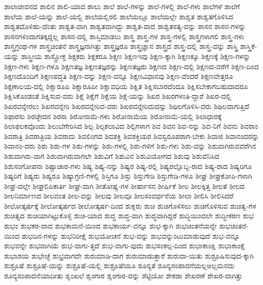 {ಶಾಲಾಜೀವನದ
ಶಾಲಿನ
ಶಾಲಿ-ಯಾದ
ಶಾಲು
ಶಾಲೆ
ಶಾಲೆ-ಗಳನ್ನು
ಶಾಲೆ-ಗಳಲ್ಲಿ
ಶಾಲೆ-ಗಳು
ಶಾಲೆಗಳೆ
ಶಾಲೆಗೆ
ಶಾಲೆಯ
ಶಾಲೆ-ಯನ್ನು
ಶಾಲೆ-ಯಲ್ಲಿ
ಶಾಲೆಯಲ್ಲಿರಲಿ
ಶಾಲೆಯಲ್ಲೂ
ಶಾಲೆಯಲ್ಲೇ
ಶಾಶ್ವತ
ಶಾಶ್ವತಗೊಳಿಸಿದ
ಶಾಶ್ವತದೊಳಿಹು-ದೆಂತು
ಶಾಶ್ವತ-ವಾಗಿ
ಶಾಶ್ವತವಾಗಿದ್ದು
ಶಾಶ್ವತ-ವಾದ
ಶಾಶ್ವತಸತ್ಯ-ವನ್ನು
ಶಾಸನ
ಶಾಸನ-ಗಳನ್ನು
ಶಾಸನಗಳಿಂದಾಗತಕ್ಕದ್ದಲ್ಲ
ಶಾಸನ-ದಲ್ಲಿ
ಶಾಸ್ತಿಮಾಡಲು
ಶಾಸ್ತ್ರ
ಶಾಸ್ತ್ರ-ಗಳ
ಶಾಸ್ತ್ರ-ಗಳಲ್ಲಿ
ಶಾಸ್ತ್ರಗಳಾಗಲಿ
ಶಾಸ್ತ್ರ-ಗಳು
ಶಾಸ್ತ್ರಗ್ರಂಥ-ಗಳ
ಶಾಸ್ತ್ರಚಿಂತನೆ
ಶಾಸ್ತ್ರಜ್ಞನಾಗಿತ್ತು
ಶಾಸ್ತ್ರಜ್ಞರೂ
ಶಾಸ್ತ್ರಜ್ಞಾನ
ಶಾಸ್ತ್ರದ
ಶಾಸ್ತ್ರ-ದಲ್ಲಿ
ಶಾಸ್ತ್ರ-ವನ್ನು
ಶಾಸ್ತ್ರಿ
ಶಾಸ್ತ್ರಿಕೆ-ಯನ್ನು
ಶಾಸ್ತ್ರೀಯ
ಶಾಸ್ತ್ರೋಕ್ತ
ಶಿಕ್ಷಕರು
ಶಿಕ್ಷಕರೂ
ಶಿಕ್ಷಣ
ಶಿಕ್ಷಣಇವು
ಶಿಕ್ಷಣ-ಕ್ಕಾಗಿ
ಶಿಕ್ಷಣಕ್ಕೂ
ಶಿಕ್ಷಣಕ್ಕೆ
ಶಿಕ್ಷಣ-ಗಳನ್ನು
ಶಿಕ್ಷಣ-ಗಳು
ಶಿಕ್ಷಣ-ಗಳೂ
ಶಿಕ್ಷಣತಜ್ಞ
ಶಿಕ್ಷಣತಜ್ಞರನ್ನು
ಶಿಕ್ಷಣತಜ್ಞರು
ಶಿಕ್ಷಣದ
ಶಿಕ್ಷಣ-ದಲ್ಲಿ
ಶಿಕ್ಷಣದ-ವರೆಗೆ
ಶಿಕ್ಷಣ-ದಿಂದ
ಶಿಕ್ಷಣದೊಂದಿಗೆ
ಶಿಕ್ಷಣಪದ್ಧತಿ
ಶಿಕ್ಷಣ-ವನ್ನು
ಶಿಕ್ಷಣ-ವನ್ನೂ
ಶಿಕ್ಷಣವಿಧಾನವು
ಶಿಕ್ಷಣ-ವೆಂದರೆ
ಶಿಕ್ಷಣವೇತ್ತರೂ
ಶಿಕ್ಷಣಾಲಯ-ದಲ್ಲಿ
ಶಿಕ್ಷಾರೂಪಿ
ಶಿಕ್ಷಾರೂಪೀ
ಶಿಕ್ಷಾವಧಿಯ
ಶಿಕ್ಷಿತ
ಶಿಕ್ಷಿಸಬಾರದೆಂದೂ
ಶಿಕ್ಷಿಸಬೇಕಾಗಬಹುದಾದರೂ
ಶಿಕ್ಷಿಸಿಕೊಂಡಂತೆ
ಶಿಕ್ಷಿಸುವ-ವರು
ಶಿಕ್ಷೆ
ಶಿಕ್ಷೆಗೆ
ಶಿಕ್ಷೆಯ
ಶಿಕ್ಷೆ-ಯನ್ನು
ಶಿಖರ
ಶಿಖರಗಳಂತಿ-ದ್ದಾರೆ
ಶಿಖರ-ದಲ್ಲಿ
ಶಿಖರವನ್ನೇರಲು
ಶಿಖರವನ್ನೇರಿ
ಶಿಖರವನ್ನೇರಿದ-ವರು
ಶಿಖರವನ್ನೇರಿದುದನ್ನು
ಶಿಥಿಲಗೊಳಿಸಿ-ದರು
ಶಿಥಿಲವಾಗುತ್ತಿದೆ
ಶಿಫಾರಸು
ಶಿರಚ್ಛೇದನ
ಶಿರಸಾ
ಶಿರೋನಾಮೆ-ಗಳು
ಶಿರೋನಾಮೆಯ
ಶಿರೋನಾಮೆ-ಯಲ್ಲಿ
ಶಿಲಾಧಾರಕ್ಕೆ
ಶಿಲಾಫಲಕವೊಂದು
ಶಿಲುಬೆಗೇರಿಸಿದ
ಶಿಲ್ಪ
ಶಿಲ್ಪಕಲಾವಿದ
ಶಿಲ್ಪಿಗಳಾಗ
ಶಿವ
ಶಿವನ
ಶಿವ-ನನ್ನು
ಶಿವ-ನಿಗೆ
ಶಿವನು
ಶಿವರಾಂ
ಶಿವರಾತ್ರಿ
ಶಿವರಾತ್ರಿಯ
ಶಿವರಾಮ
ಶಿವಲಿಂಗದ
ಶಿವಶಕ್ತಿ
ಶಿವಶಕ್ತಿಯರ
ಶಿವಸ್ವರೂಪರಾಗ-ಬೇಕು
ಶಿವಾಜಿ
ಶಿವಾನಂದರನ್ನು
ಶಿವಾನಂ-ದರು
ಶಿಶು
ಶಿಶು-ಗಳ
ಶಿಶು-ಗಳನ್ನು
ಶಿಶು-ಗಳಲ್ಲಿ
ಶಿಶು-ಗಳಿಗೆ
ಶಿಶು-ಗಳು
ಶಿಶು-ವನ್ನು
ಶಿಶುವಾಗಿರುವವರೆಗಿನ
ಶಿಶುವಾಗಿರು-ವಾಗ
ಶಿಶುವಾಗಿರುವಾಗಲೇ
ಶಿಶುವಿಗೆ
ಶಿಶುವಿನ
ಶಿಶುವಿಯೋಗದ
ಶಿಶುವು
ಶಿಶುವೆನಿಸಿದ
ಶಿಶುಸಂಗೋಪನಾ
ಶಿಷ್ಟಾಚಾರ-ಗಳು
ಶಿಷ್ಯ
ಶಿಷ್ಯ-ನನ್ನು
ಶಿಷ್ಯರ
ಶಿಷ್ಯ-ರಲ್ಲಿ
ಶಿಷ್ಯರಲ್ಲೊಬ್ಬ-ರಾದ
ಶಿಷ್ಯ-ರಾದ
ಶಿಷ್ಯರಿಗೂ
ಶಿಷ್ಯರಿಗೆ
ಶಿಷ್ಯರು
ಶಿಷ್ಯರೂ
ಶಿಷ್ಯಾಗ್ರಣಿ-ಗಳಲ್ಲಿ
ಶಿಸ್ತಿಗೂ
ಶಿಸ್ತು
ಶಿಸ್ತುಗೇಡಿ
ಶಿಸ್ತುಗೇಡಿ-ಗಳೂ
ಶೀಘ್ರ
ಶೀಘ್ರಕೋಪಿ-ಗಳಾಗಿ
ಶೀಘ್ರ-ದಲ್ಲೇ
ಶೀಘ್ರಲಿಪಿಕಾರ್ತಿ
ಶೀಘ್ರ-ವಾಗಿ
ಶೀತೋಷ್ಣ-ಗಳ
ಶೀರ್ಷಾಸನ
ಶೀರ್ಷಿಕೆ
ಶೀಲ
ಶೀಲಕ್ಕಿತ್ತ
ಶೀಲತೆ
ಶೀಲದ
ಶೀಲನಿರ್ಮಾಣದ
ಶೀಲವಂತ
ಶೀಲ-ವನ್ನು
ಶೀಲವು
ಶೀಲವೂ
ಶೀಲಸಂವರ್ಧನೆಯ
ಶೀಲಾ
ಶೀಲಿಸಿ
ಶೀಲಿಸಿದರೆ
ಶೀಲೋತ್ಕರ್ಷಕ್ಕೆ
ಶೀಲೋತ್ಕರ್ಷದ
ಶೀಲೋತ್ಕರ್ಷ-ದಿಂದ
ಶುಕ್ಲರು
ಶುಚಿ
ಶುಚಿಗೊಳಿಸಲು
ಶುಚಿಗೊಳಿಸುವ
ಶುಚಿತ್ವ-ಗಳ
ಶುಚಿತ್ವದ
ಶುಚಿಯಾಗಿಟ್ಟುಕೊಳ್ಳಿ
ಶುಚಿ-ಯಾದ
ಶುದ್ಧ
ಶುದ್ಧ-ವಾಗಿ
ಶುದ್ಧವಾಗಿದ್ದರೆ
ಶುದ್ಧಿಯಿಂದಲೇ
ಶುದ್ಧೀಕರಣ
ಶುಭ
ಶುಭಂ
ಶುಭಕರ-ವಾದ
ಶುಭಕಾಮನೆ-ಯಿಂದ
ಶುಭಕಾರ್ಯ-ವನ್ನೂ
ಶುಭ-ಕ್ಕಾಗಿ
ಶುಭಚಿಂತನೆಯನ್ನೇ
ಶುಭಚಿಂತನೆ-ಯಿಂದ
ಶುಭದಿನ-ಗಳನ್ನು
ಶುಭನಿರೀಕ್ಷೆ
ಶುಭಯೋಚನೆ
ಶುಭ-ವನ್ನು
ಶುಭವನ್ನುಂಟುಮಾಡುವುದೆ
ಶುಭ-ವನ್ನೂ
ಶುಭವನ್ನೇ
ಶುಭವಾಗಿಯೆ
ಶುಭ-ವಾಗು-ತ್ತದೆ
ಶುಭ-ವಾಗು-ವುದು
ಶುಭಸಂಕಲ್ಪ-ದಿಂದ
ಶುಭಾಕಾಂಕ್ಷಿ
ಶುಭಾಕಾಂಕ್ಷೆ
ಶುಭಾಶಯ
ಶುಭೇಚ್ಛೆ
ಶುಭ್ರವಾಗದೇ
ಶುರುಮಾಡಿ-ದಾಗ
ಶುರುಮಾಡುತ್ತಾರೆ
ಶುರುವಾ-ಯಿತು
ಶುಶ್ರೂಷಿಸುವುದ-ಕ್ಕಾಗಿ
ಶುಶ್ರೂಷೆ
ಶುಶ್ರೂಷೆ-ಯನ್ನು
ಶುಶ್ರೂಷೆ-ಯಲ್ಲಿ
ಶುಶ್ರೂಷೆಯೂ
ಶೂನ್ಯತೆ
ಶೂನ್ಯಸಂಪಾದನೆಯಲ್ಲಅಲ್ಲಮನದು
ಶೂನ್ಯಸಂಪಾದನೆಯಾದೀತು
ಶೃಂಖಲೆ
ಶೃಂಗಾರ
ಶೃಂಗಾರ-ವನ್ನು
ಶೆಟ್ಟಿಯೋ
ಶೇಕಡಾ
ಶೇಖರಣೆ
ಶೇಖರ-ವಾಗಿತ್ತು
}
